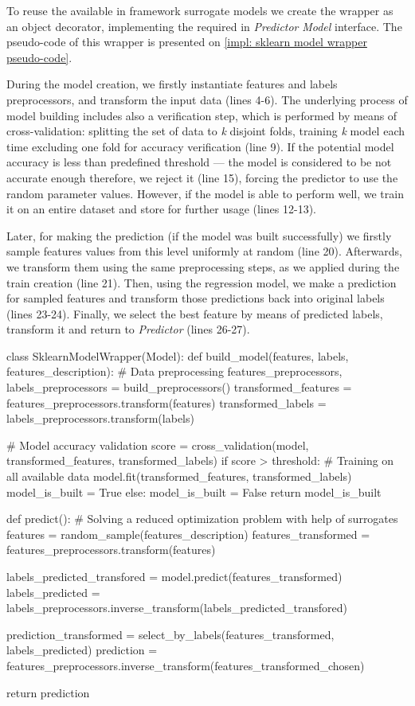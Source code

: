 To reuse the available in framework surrogate models we create the wrapper as an object decorator, implementing the required in \emph{Predictor} \emph{Model} interface. The pseudo-code of this wrapper is presented on \cref{impl: sklearn model wrapper pseudo-code}.

During the model creation, we firstly instantiate features and labels preprocessors, and transform the input data (lines 4-6). The underlying process of model building includes also a verification step, which is performed by means of cross-validation: splitting the set of data to \textit{k} disjoint folds, training \textit{k} model each time excluding one fold for accuracy verification (line 9). If the potential model accuracy is less than predefined threshold — the model is considered to be not accurate enough therefore, we reject it (line 15), forcing the predictor to use the random parameter values. However, if the model is able to perform well, we train it on an entire dataset and store for further usage (lines 12-13).

Later, for making the prediction (if the model was built successfully) we firstly sample features values from this level uniformly at random (line 20). Afterwards, we transform them using the same preprocessing steps, as we applied during the train creation (line 21). Then, using the regression model, we make a prediction for sampled features and transform those predictions back into original labels (lines 23-24). Finally, we select the best feature by means of predicted labels, transform it and return to \emph{Predictor} (lines 26-27).

\begin{code}[language=Python, caption=Scikit-learn linear model wrapper pseudo-code., label=impl: sklearn model wrapper pseudo-code]
class SklearnModelWrapper(Model):
	def build_model(features, labels, features_description):
		# Data preprocessing
		features_preprocessors, labels_preprocessors = build_preprocessors()
		transformed_features = features_preprocessors.transform(features)
	 	transformed_labels = labels_preprocessors.transform(labels)
	 	
	 	# Model accuracy validation
	 	score = cross_validation(model, transformed_features, transformed_labels)
	 	if score > threshold:
	 		# Training on all available data
	 		model.fit(transformed_features, transformed_labels)
	 		model_is_built = True
	 	else:
	 		model_is_built = False
	 	return model_is_built
	 
	 def predict():
	 	# Solving a reduced optimization problem with help of surrogates
	 	features = random_sample(features_description)
	 	features_transformed = features_preprocessors.transform(features)
	 	
	 	labels_predicted_transfored = model.predict(features_transformed)
	 	labels_predicted = labels_preprocessors.inverse_transform(labels_predicted_transfored)
	 	
	 	prediction_transformed = select_by_labels(features_transformed, labels_predicted)
	 	prediction = features_preprocessors.inverse_transform(features_transformed_chosen)
	 	
		return prediction
\end{code}

